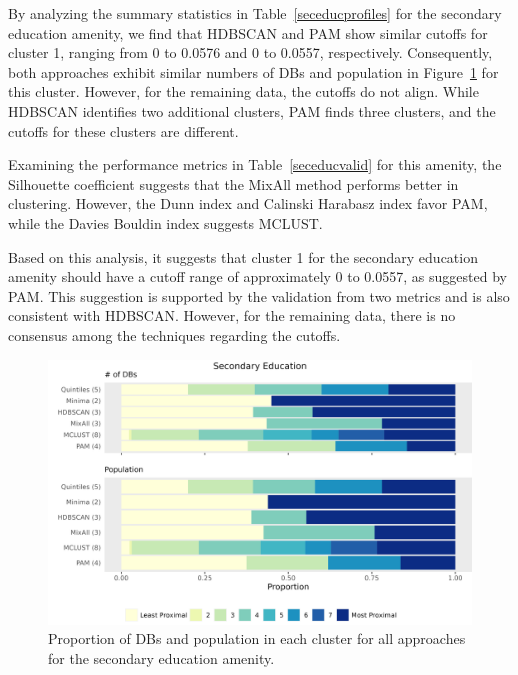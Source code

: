 \documentclass[11pt, a4paper]{article}
\begin{document}
By analyzing the summary statistics in Table~\ref{seceducprofiles} for the secondary education amenity, we find that HDBSCAN and PAM show similar cutoffs for cluster 1, ranging from 0 to 0.0576 and 0 to 0.0557, respectively. Consequently, both approaches exhibit similar numbers of DBs and population in Figure~\ref{seceducbarplot} for this cluster. However, for the remaining data, the cutoffs do not align. While HDBSCAN identifies two additional clusters, PAM finds three clusters, and the cutoffs for these clusters are different.
\par
Examining the performance metrics in Table~\ref{seceducvalid} for this amenity, the Silhouette coefficient suggests that the MixAll method performs better in clustering. However, the Dunn index and Calinski Harabasz index favor PAM, while the Davies Bouldin index suggests MCLUST.
\par
Based on this analysis, it suggests that cluster 1 for the secondary education amenity should have a cutoff range of approximately 0 to 0.0557, as suggested by PAM. This suggestion is supported by the validation from two metrics and is also consistent with HDBSCAN. However, for the remaining data, there is no consensus among the techniques regarding the cutoffs.



\begin{figure}[H]
\centering
\includegraphics[width=\textwidth]{./barplot_comparison/Secondary Education_barplot.png}
\caption[Secondary education profile barplot]{Proportion of DBs and population in each cluster for all approaches for the secondary education amenity.}\label{seceducbarplot}
\end{figure}
\end{document}

